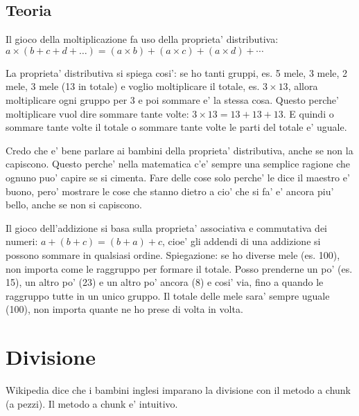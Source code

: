 \documentclass[a4paper]{article}
\begin{document}
\subsection{Teoria}
Il gioco della moltiplicazione fa uso della proprieta' distributiva: $a \times (b+c+d+\ldots) = (a\times b)+(a\times c)+(a\times d)+\cdots$

\begin{exemp}
\end{exemp}

La proprieta' distributiva si spiega cosi': se ho tanti gruppi, es. 5 mele,  3 mele, 2 mele, 3 mele (13 in totale) e voglio moltiplicare il totale, es. $3 \times 13$, allora moltiplicare ogni gruppo per 3 e poi sommare e' la stessa cosa. Questo perche' moltiplicare vuol dire sommare tante volte: $3\times 13 = 13+13+13$. E quindi o sommare tante volte il totale o sommare tante volte le parti del totale e' uguale.

\begin{rem}
	Credo che e' bene parlare ai bambini della proprieta' distributiva, anche se non la capiscono. Questo perche' nella matematica c'e' sempre una semplice ragione che ognuno puo' capire se si cimenta. Fare delle cose solo perche' le dice il maestro e' buono, pero' mostrare le cose che stanno dietro a cio' che si fa' e' ancora piu' bello, anche se non si capiscono. 
\end{rem}

Il gioco dell'addizione si basa sulla proprieta' associativa e commutativa dei numeri: $a+(b+c)=(b+a)+c$, cioe' gli addendi di una addizione si possono sommare in qualsiasi ordine. Spiegazione: se ho diverse mele (es. 100), non importa come le raggruppo per formare il totale. Posso prenderne un po' (es. 15), un altro po' (23) e un altro po' ancora (8) e cosi' via, fino a quando le raggruppo tutte in un unico gruppo. Il totale delle mele sara' sempre uguale (100), non importa quante ne ho prese di volta in volta.

\section{Divisione}

Wikipedia dice che i bambini inglesi imparano la divisione con il metodo a chunk (a pezzi). Il metodo a chunk e' intuitivo.
\end{document}
